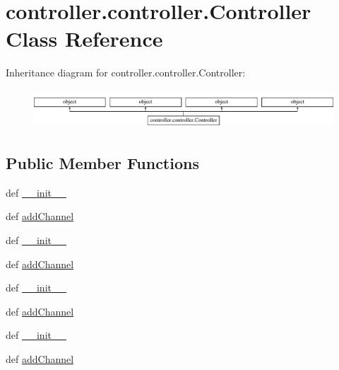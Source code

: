 \hypertarget{classcontroller_1_1controller_1_1Controller}{}\section{controller.\+controller.\+Controller Class Reference}
\label{classcontroller_1_1controller_1_1Controller}
Inheritance diagram for controller.\+controller.\+Controller\+:\begin{figure}[H]
\begin{center}
\leavevmode
\includegraphics[height=1.458333cm]{classcontroller_1_1controller_1_1Controller}
\end{center}
\end{figure}
\subsection*{Public Member Functions}
\begin{DoxyCompactItemize}
\item 
def \hyperlink{classcontroller_1_1controller_1_1Controller_a3d1afce0394fdd46f748161ac6078bd1}{\+\_\+\+\_\+init\+\_\+\+\_\+}
\item 
def \hyperlink{classcontroller_1_1controller_1_1Controller_a5302cdeab4a3beda9c476188bad72023}{add\+Channel}
\item 
def \hyperlink{classcontroller_1_1controller_1_1Controller_a3d1afce0394fdd46f748161ac6078bd1}{\+\_\+\+\_\+init\+\_\+\+\_\+}
\item 
def \hyperlink{classcontroller_1_1controller_1_1Controller_a5302cdeab4a3beda9c476188bad72023}{add\+Channel}
\item 
def \hyperlink{classcontroller_1_1controller_1_1Controller_a3d1afce0394fdd46f748161ac6078bd1}{\+\_\+\+\_\+init\+\_\+\+\_\+}
\item 
def \hyperlink{classcontroller_1_1controller_1_1Controller_a5302cdeab4a3beda9c476188bad72023}{add\+Channel}
\item 
def \hyperlink{classcontroller_1_1controller_1_1Controller_a3d1afce0394fdd46f748161ac6078bd1}{\+\_\+\+\_\+init\+\_\+\+\_\+}
\item 
def \hyperlink{classcontroller_1_1controller_1_1Controller_a5302cdeab4a3beda9c476188bad72023}{add\+Channel}
\end{DoxyCompactItemize}
